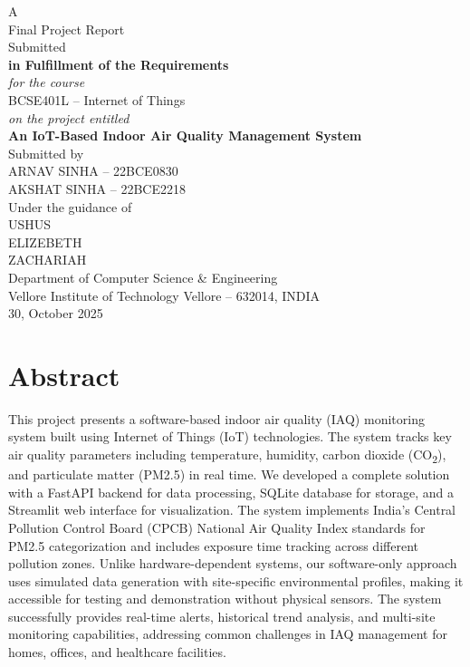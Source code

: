 \documentclass[12pt]{report}
\newcommand{\course}{BCSE401L -- Internet of Things}
\newcommand{\projecttitle}{An IoT-Based Indoor Air Quality Management System}
\newcommand{\institute}{Vellore Institute of Technology Vellore -- 632014, INDIA}
\newcommand{\dept}{Department of Computer Science \& Engineering}
\newcommand{\authors}{ARNAV SINHA -- 22BCE0830\\AKSHAT SINHA -- 22BCE2218}
\newcommand{\guides}{USHUS\\ELIZEBETH\\ZACHARIAH}
\newcommand{\reportdate}{30, October 2025}
\begin{document}
\begin{titlepage}
\centering
\vspace*{1cm}
{\large A\\[6pt] Final Project Report\\[6pt] Submitted}\\[12pt]
{\bfseries\Large in Fulfillment of the Requirements}\\[10pt]
{\itshape for the course}\\[4pt]
{\Large \course}\\[8pt]
{\itshape on the project entitled}\\[4pt]
{\bfseries\LARGE \projecttitle}\\[12pt]
{Submitted by}\\[6pt]
{\large \authors}\\[12pt]
{Under the guidance of}\\[6pt]
{\large \guides}\\[12pt]
\vfill
{}
{\dept}\\[4pt]
{\institute}\\[6pt]
{\reportdate}
\end{titlepage}

\tableofcontents
\cleardoublepage
{}

\section*{Abstract}
This project presents a software-based indoor air quality (IAQ) monitoring system built using Internet of Things (IoT) technologies. The system tracks key air quality parameters including temperature, humidity, carbon dioxide (CO\textsubscript{2}), and particulate matter (PM2.5) in real time. We developed a complete solution with a FastAPI backend for data processing, SQLite database for storage, and a Streamlit web interface for visualization. The system implements India's Central Pollution Control Board (CPCB) National Air Quality Index standards for PM2.5 categorization and includes exposure time tracking across different pollution zones. Unlike hardware-dependent systems, our software-only approach uses simulated data generation with site-specific environmental profiles, making it accessible for testing and demonstration without physical sensors. The system successfully provides real-time alerts, historical trend analysis, and multi-site monitoring capabilities, addressing common challenges in IAQ management for homes, offices, and healthcare facilities.
\end{document}
